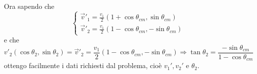 \documentclass[../main.tex]{subfiles}
\begin{document}
Ora sapendo che
\begin{equation*}
	\begin{cases}
		\vec v'_1 =\frac{v_1}2(1+\cos\theta_{cm},\sin\theta_{cm}) \\
		\vec v'_2=\frac{v_1}2 (1-\cos\theta_{cm},-\sin\theta_{cm})
	\end{cases}
\end{equation*}
e che 
\begin{equation*}
	v'_2(\cos\theta_2,\sin\theta_2)=\vec v'_2=\frac{v_1}2 (1-\cos\theta_{cm},-\sin\theta_{cm}) \Longrightarrow \tan\theta_2=\frac{-\sin\theta_{cm}}{1-\cos\theta_{cm}}
\end{equation*}
ottengo facilmente i dati richiesti dal problema, cioè $v_1',v_2'$ e $\theta_2$.
\end{document}
